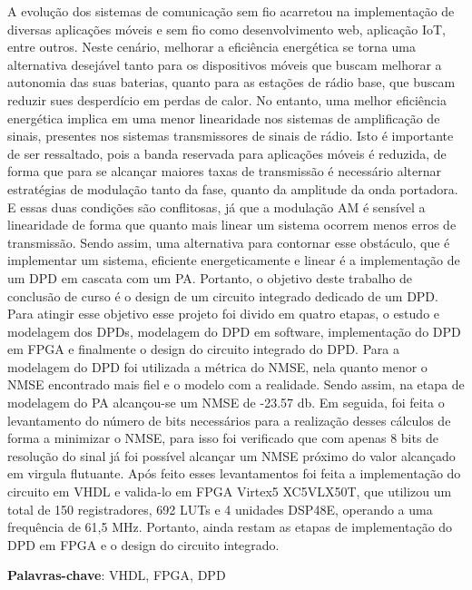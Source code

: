 A evolução dos sistemas de comunicação sem fio acarretou na implementação de diversas aplicações móveis e sem fio como desenvolvimento web, aplicação IoT, entre outros. Neste cenário, melhorar a eficiência energética se torna uma alternativa desejável tanto para os dispositivos móveis que buscam melhorar a autonomia das suas baterias, quanto para as estações de rádio base, que buscam reduzir sues desperdício em perdas de calor. No entanto, uma melhor eficiência energética implica em uma menor linearidade nos sistemas de amplificação de sinais, presentes nos sistemas transmissores de sinais de rádio. Isto é importante de ser ressaltado, pois a banda reservada para aplicações móveis é reduzida, de forma que para se alcançar maiores taxas de transmissão é necessário alternar estratégias de modulação tanto da fase, quanto da amplitude da onda portadora. E essas duas condições são conflitosas, já que a modulação AM é sensível a linearidade de forma que quanto mais linear um sistema ocorrem menos erros de transmissão. Sendo assim, uma alternativa para contornar esse obstáculo, que é implementar um sistema, eficiente energeticamente e linear é a implementação de um DPD em cascata com um PA. Portanto, o objetivo deste trabalho de conclusão de curso é o design de um circuito integrado dedicado de um DPD. Para atingir esse objetivo esse projeto foi divido em quatro etapas, o estudo e modelagem dos DPDs, modelagem do DPD em software, implementação do DPD em FPGA e finalmente o design do circuito integrado do DPD. Para a modelagem do DPD foi utilizada a métrica do NMSE, nela quanto menor o NMSE encontrado mais fiel e o modelo com a realidade. Sendo assim, na etapa de modelagem do PA alcançou-se um NMSE de -23.57 db. Em seguida, foi feita o levantamento do número de bits necessários para a realização desses cálculos de forma a minimizar o NMSE, para isso foi verificado que com apenas 8 bits de resolução do sinal já foi possível alcançar um NMSE próximo do valor alcançado em virgula flutuante. Após feito esses levantamentos foi feita a implementação do circuito em VHDL e valida-lo em FPGA Virtex5 XC5VLX50T, que utilizou um total de 150 registradores, 692 LUTs e 4 unidades DSP48E, operando a uma frequência de 61,5 MHz. Portanto, ainda restam as etapas de implementação do DPD em FPGA e o design do circuito integrado. 

\textbf{Palavras-chave}: VHDL, FPGA, DPD 
